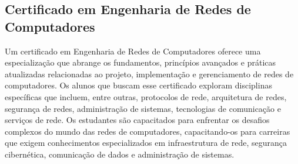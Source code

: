 \subsection{Certificado em Engenharia de Redes de \mbox{Computadores}}

Um certificado em Engenharia de Redes de Computadores oferece uma especialização que abrange os fundamentos, princípios avançados e práticas atualizadas relacionadas ao projeto, implementação e gerenciamento de redes de computadores. Os alunos que buscam esse certificado exploram disciplinas específicas que incluem, entre outras, protocolos de rede, arquitetura de redes, segurança de redes, administração de sistemas, tecnologias de comunicação e serviços de rede. Os estudantes são capacitados para enfrentar os desafios complexos do mundo das redes de computadores, capacitando-os para carreiras que exigem conhecimentos especializados em infraestrutura de rede, segurança cibernética, comunicação de dados e administração de sistemas.


